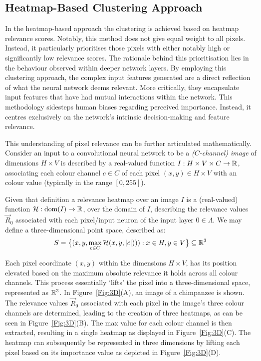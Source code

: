 \subsection{Heatmap-Based Clustering Approach}

In the heatmap-based approach the clustering is achieved based on heatmap relevance scores. Notably, this method does not give equal weight to all pixels. Instead, it particularly prioritises those pixels with either notably high or significantly low relevance scores. The rationale behind this prioritisation lies in the behaviour observed within deeper network layers. By employing this clustering approach, the complex input features generated are a direct reflection of what the neural network deems relevant. More critically, they encapsulate input features that have had mutual interactions within the network. This methodology sidesteps human biases regarding perceived importance. Instead, it centres exclusively on the network's intrinsic decision-making and feature relevance.

This understanding of pixel relevance can be further articulated mathematically. Consider an input to a convolutional neural network to be a \emph{($C$-channel) image} of dimensions $H\times V$ is described by a real-valued function $I:H\times V\times C \to \mathbb{R}$, associating each colour channel $c\in C$ of each pixel $(x,y) \in H\times V$ with an colour value (typically in the range $[0,255]$).


Given that definition a relevance heatmap over an image $I$ is a (real-valued) function $\mathcal{H}: \mathrm{dom}(I) \to \mathbb{R}$, over the domain of $I$, describing the relevance values $\vec{R}_0$ associated with each pixel/input neuron of the input layer $0\in \Lambda$. We may define a three-dimensional point space, described as:
\begin{equation*}
    S = \big\{(x,y,\max_{c\in C} \mathcal{H}(x,y,|c|))) : x\in H, y\in V\big\} \subseteq \mathbb{R}^3
\end{equation*}

Each pixel coordinate $(x,y)$ within the dimensions $H\times V$, has its position elevated based on the maximum absolute relevance it holds across all colour channels. This process essentially `lifts' the pixel into a three-dimensional space, represented as $\mathbb{R}^3$. In Figure~\ref{Fig:3D}(A), an image of a chimpanzee is shown. The relevance values $\vec{R}_0$ associated with each pixel in the image's three colour channels are determined, leading to the creation of three heatmaps, as can be seen in Figure~\ref{Fig:3D}(B). The max value for each colour channel is then extracted, resulting in a single heatmap as displayed in Figure~\ref{Fig:3D}(C). The heatmap can subsequently be represented in three dimensions by lifting each pixel based on its importance value as depicted in Figure~\ref{Fig:3D}(D).

